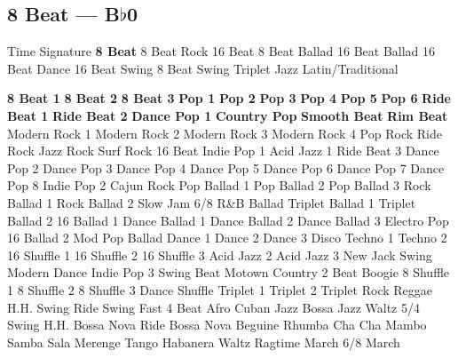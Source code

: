 \subsection{8 Beat --- B$\flat$0}
Time Signature
\textbf{8 Beat}
8 Beat Rock
16 Beat
8 Beat Ballad
16 Beat Ballad
16 Beat Dance
16 Beat Swing
8 Beat Swing
Triplet
Jazz
Latin/Traditional





























\textbf{8 Beat 1}
\textbf{8 Beat 2}
\textbf{8 Beat 3}
\textbf{Pop 1}
\textbf{Pop 2}
\textbf{Pop 3}
\textbf{Pop 4}
\textbf{Pop 5}
\textbf{Pop 6}
\textbf{Ride Beat 1}
\textbf{Ride Beat 2}
\textbf{Dance Pop 1}
\textbf{Country Pop}
\textbf{Smooth Beat}
\textbf{Rim Beat}
Modern Rock 1
Modern Rock 2
Modern Rock 3
Modern Rock 4
Pop Rock
Ride Rock
Jazz Rock
Surf Rock
16 Beat
Indie Pop 1
Acid Jazz 1
Ride Beat 3
Dance Pop 2
Dance Pop 3
Dance Pop 4
Dance Pop 5
Dance Pop 6
Dance Pop 7
Dance Pop 8
Indie Pop 2
Cajun Rock
Pop Ballad 1
Pop Ballad 2
Pop Ballad 3
Rock Ballad 1
Rock Ballad 2
Slow Jam
6/8 R\&B Ballad
Triplet Ballad 1
Triplet Ballad 2
16 Ballad 1
Dance Ballad 1
Dance Ballad 2
Dance Ballad 3
Electro Pop
16 Ballad 2
Mod Pop Ballad
Dance 1
Dance 2
Dance 3
Disco
Techno 1
Techno 2
16 Shuffle 1
16 Shuffle 2
16 Shuffle 3
Acid Jazz 2
Acid Jazz 3
New Jack Swing
Modern Dance
Indie Pop 3
Swing Beat
Motown
Country 2 Beat
Boogie
8 Shuffle 1
8 Shuffle 2
8 Shuffle 3
Dance Shuffle
Triplet 1
Triplet 2
Triplet Rock
Reggae
H.H. Swing
Ride Swing
Fast 4 Beat
Afro Cuban
Jazz Bossa
Jazz Waltz
5/4 Swing
H.H. Bossa Nova
Ride Bossa Nova
Beguine
Rhumba
Cha Cha
Mambo
Samba
Sala
Merenge
Tango
Habanera
Waltz
Ragtime
March
6/8 March
